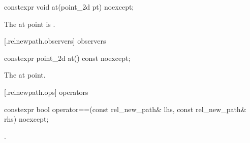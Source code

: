 %
\begin{itemdecl}
constexpr void at(point_2d pt) noexcept;
\end{itemdecl}
\begin{itemdescr}
\pnum
\effects
The at point is .
\end{itemdescr}

 [\iotwod.relnewpath.observers]{ observers}%

%
\begin{itemdecl}
constexpr point_2d at() const noexcept;
\end{itemdecl}
\begin{itemdescr}
\pnum
\returns
The at point.
\end{itemdescr}

 [\iotwod.relnewpath.ops]{ operators}%

%
\begin{itemdecl}
constexpr bool operator==(const rel_new_path& lhs, const rel_new_path& rhs) 
  noexcept;
\end{itemdecl}
\begin{itemdescr}
\pnum
\returns
{}.
\end{itemdescr}
